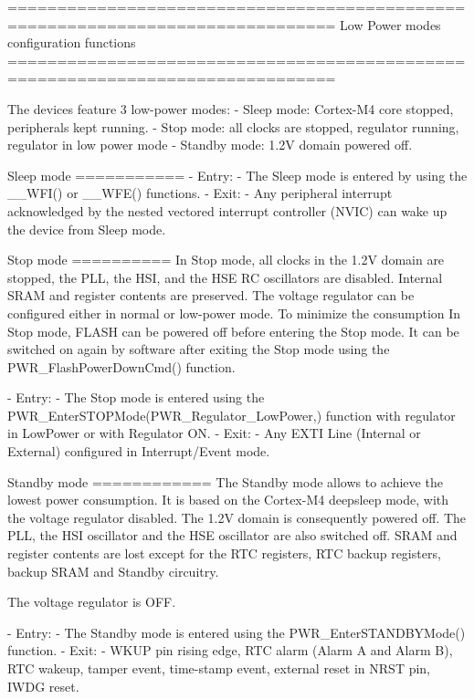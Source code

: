\begin{DoxyVerb} ===============================================================================
                    Low Power modes configuration functions
 ===============================================================================  

  The devices feature 3 low-power modes:
   - Sleep mode: Cortex-M4 core stopped, peripherals kept running.
   - Stop mode: all clocks are stopped, regulator running, regulator in low power mode
   - Standby mode: 1.2V domain powered off.
   
   Sleep mode
   ===========
    - Entry:
      - The Sleep mode is entered by using the __WFI() or __WFE() functions.
    - Exit:
      - Any peripheral interrupt acknowledged by the nested vectored interrupt 
        controller (NVIC) can wake up the device from Sleep mode.

   Stop mode
   ==========
   In Stop mode, all clocks in the 1.2V domain are stopped, the PLL, the HSI,
   and the HSE RC oscillators are disabled. Internal SRAM and register contents 
   are preserved.
   The voltage regulator can be configured either in normal or low-power mode.
   To minimize the consumption In Stop mode, FLASH can be powered off before 
   entering the Stop mode. It can be switched on again by software after exiting 
   the Stop mode using the PWR_FlashPowerDownCmd() function. 
   
    - Entry:
      - The Stop mode is entered using the PWR_EnterSTOPMode(PWR_Regulator_LowPower,) 
        function with regulator in LowPower or with Regulator ON.
    - Exit:
      - Any EXTI Line (Internal or External) configured in Interrupt/Event mode.
      
   Standby mode
   ============
   The Standby mode allows to achieve the lowest power consumption. It is based 
   on the Cortex-M4 deepsleep mode, with the voltage regulator disabled. 
   The 1.2V domain is consequently powered off. The PLL, the HSI oscillator and 
   the HSE oscillator are also switched off. SRAM and register contents are lost 
   except for the RTC registers, RTC backup registers, backup SRAM and Standby 
   circuitry.
   
   The voltage regulator is OFF.
      
    - Entry:
      - The Standby mode is entered using the PWR_EnterSTANDBYMode() function.
    - Exit:
      - WKUP pin rising edge, RTC alarm (Alarm A and Alarm B), RTC wakeup,
        tamper event, time-stamp event, external reset in NRST pin, IWDG reset.              


\end{DoxyVerb}
